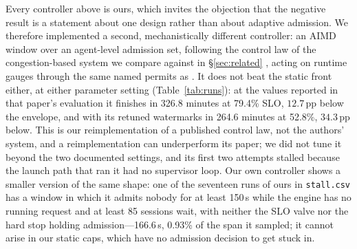Every controller above is ours, which invites the objection that the negative
result is a statement about one design rather than about adaptive admission. We
therefore implemented a second, mechanistically different controller: an AIMD
window over an agent-level admission set, following the control law of the
congestion-based system we compare against in \S\ref{sec:related} \cite{concur,jacobson1988},
acting on runtime gauges through the same named permits as \sys{}. It does not
beat the static front either, at either parameter setting
(Table~\ref{tab:runs}): at the values reported in that paper's evaluation it
finishes in 326.8 minutes at 79.4\% SLO, $12.7$\,pp below the envelope, and with
its retuned watermarks in 264.6 minutes at 52.8\%, $34.3$\,pp below. This is our
reimplementation of a published control law, not the authors' system, and a
reimplementation can underperform its paper; we did not tune it beyond the two
documented settings, and its
first two attempts stalled because the launch path that ran it had no supervisor
loop. Our own controller shows a smaller version of the same shape: one of the
seventeen runs of ours in \texttt{stall.csv} has a window in which it admits nobody
for at least 150\,s while the engine has no running request and at least 85
sessions wait, with neither the SLO valve nor the hard stop holding
admission---166.6\,s, 0.93\% of the span it sampled; it cannot arise in our static
caps, which have no admission decision to get stuck in.
